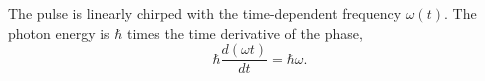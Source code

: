 \documentclass{article}
\begin{document}
The pulse is linearly chirped with the time-dependent frequency $\omega(t)$.
The photon energy is $\hbar$ times the time derivative of the phase,
\begin{equation}
\hbar\frac{d(\omega t)}{dt} = \hbar\omega .
\label{eq:chirp}
\end{equation}
\end{document}
